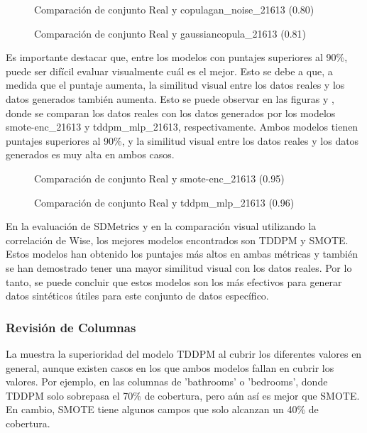 \begin{figure}[H]
    \centering
	
	\caption{Comparación de conjunto Real y copulagan\_noise\_21613 (0.80)}
	\label{r-pair-copulagan_noise_21613}
\end{figure}
\begin{figure}[H]
    \centering
	
	\caption{Comparación de conjunto Real y gaussiancopula\_21613 (0.81)}
	\label{r-pair-gaussiancopula_21613}
\end{figure}

\newpage 
Es importante destacar que, entre los modelos con puntajes superiores al 90\%, puede ser difícil evaluar visualmente cuál es el mejor. Esto se debe a que, a medida que el puntaje aumenta, la similitud visual entre los datos reales y los datos generados también aumenta. Esto se puede observar en las figuras  y , donde se comparan los datos reales con los datos generados por los modelos smote-enc\_21613 y tddpm\_mlp\_21613, respectivamente. Ambos modelos tienen puntajes superiores al 90\%, y la similitud visual entre los datos reales y los datos generados es muy alta en ambos casos.

\begin{figure}[H]
    \centering
    
    \caption{Comparación de conjunto Real y smote-enc\_21613 (0.95)}
    \label{r-pair-smote-enc_21613}
\end{figure}
\begin{figure}[H]
    \centering
    
    \caption{Comparación de conjunto Real y tddpm\_mlp\_21613 (0.96)}
    \label{r-pair-tddpm_mlp_21613}
\end{figure}

En la evaluación de SDMetrics y en la comparación visual utilizando la correlación de Wise, los mejores modelos encontrados son TDDPM y SMOTE. Estos modelos han obtenido los puntajes más altos en ambas métricas y también se han demostrado tener una mayor similitud visual con los datos reales. Por lo tanto, se puede concluir que estos modelos son los más efectivos para generar datos sintéticos útiles para este conjunto de datos específico.

\newpage
\subsubsection{Revisión de Columnas}
La  muestra la superioridad del modelo TDDPM al cubrir los diferentes valores en general, aunque existen casos en los que ambos modelos fallan en cubrir los valores. Por ejemplo, en las columnas de 'bathrooms' o 'bedrooms', donde TDDPM solo sobrepasa el 70\% de cobertura, pero aún así es mejor que SMOTE. En cambio, SMOTE tiene algunos campos que solo alcanzan un 40\% de cobertura.

